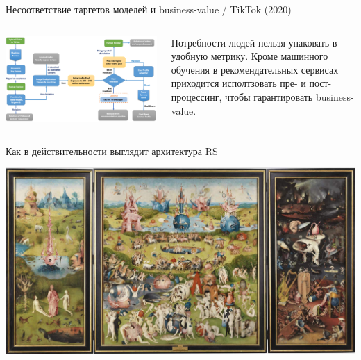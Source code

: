 \documentclass[11pt,aspectratio=169]{beamer}
\begin{document}
\begin{frame}{Несоответствие таргетов моделей и business-value / TikTok (2020) \cite{TIK}}
\begin{columns}
\begin{column}{0.6\textwidth}
   \begin{center}
		\includegraphics[scale=0.24]{images/tiktok.png}
   \end{center}
\end{column}
\begin{column}{0.35\textwidth}
    \begin{small}
    \begin{tcolorbox}[colback=info!5,colframe=info!80,title=]
    Потребности людей нельзя упаковать в удобную метрику. Кроме машинного обучения  в рекомендательных сервисах приходится исполтзовать пре- и пост-процессинг, чтобы гарантировать business-value.
    \end{tcolorbox}
    \end{small}
\end{column}
\end{columns}

\end{frame}

\begin{frame}{Как в действительности выглядит архитектура RS}

\begin{center}
\includegraphics[scale=0.15]{images/bosch.jpeg}
\end{center}

\end{frame}
\end{document}
